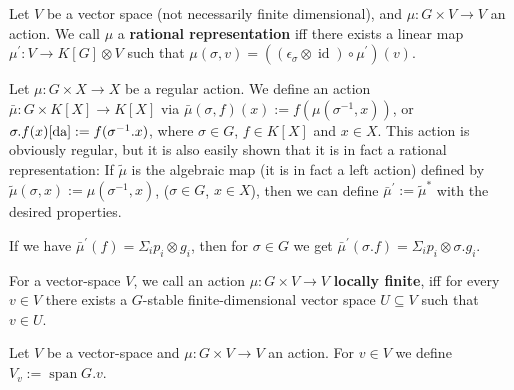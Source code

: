 
\begin{definition}\label{rr}
  Let $V$ be a vector space (not necessarily finite dimensional), and $ \mu : G \times V \longrightarrow V $ an action.
  We call $ \mu $ a \textbf{rational representation} iff there exists a linear map $ \mu^\prime \colon V \longrightarrow K[G] \otimes V $ such that $ \mu \left( \sigma , v \right) = \left( \left( \epsilon_\sigma \otimes \operatorname{id} \right) \circ \mu^\prime \right) \left(v\right) $.
\end{definition}

\begin{definition}\label{funrep}
  Let $\mu \colon G \times X \longrightarrow X$ be a regular action.
  We define an action $\bar{\mu} \colon G \times K[X] \longrightarrow K[X]$ via $\bar{\mu}(\sigma,f)(x) := f(\mu(\sigma^{-1},x))$, or $\sigma.f (x)\ref{da} := f( \sigma^{-1}.x )$, where  $\sigma \in G$, $f \in K[X]$ and $x \in X$.
  This action is obviously regular, but it is also easily shown that it is in fact a rational representation:
  If $\tilde{\mu}$ is the algebraic map (it is in fact a left action) defined by $ \tilde{\mu} (\sigma,x) := \mu (\sigma^{-1},x)$, ($\sigma \in G$, $x \in X$), then we can define $ \bar{\mu}^\prime := \tilde{\mu}^\ast $ with the desired properties.
\end{definition}

\begin{proposition}\label{rara}
  If we have $\bar{\mu}^\prime (f) = \Sigma_i p_i \otimes g_i$, then for $\sigma \in G$ we get $\bar{\mu}^\prime (\sigma.f) = \Sigma_i p_i \otimes \sigma.g_i$.
\end{proposition}

\begin{definition}
  For a vector-space $V$, we call an action $\mu \colon G \times V \longrightarrow V$ \textbf{locally finite}, iff for every $v \in V$ there exists a $G$-stable finite-dimensional vector space $U \subseteq V$ such that $v \in U$.
\end{definition}

\begin{definition}
  Let $V$ be a vector-space and $\mu \colon G \times V \longrightarrow V$ an action.
  For $v \in V$ we define $V_v := \operatorname{span} G.v$.
\end{definition}

